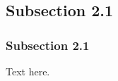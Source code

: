 \subsection{Subsection 2.1}

\begin{frame}[label=2]
\frametitle{Subsection 2.1}

Text here.
\end{frame}
